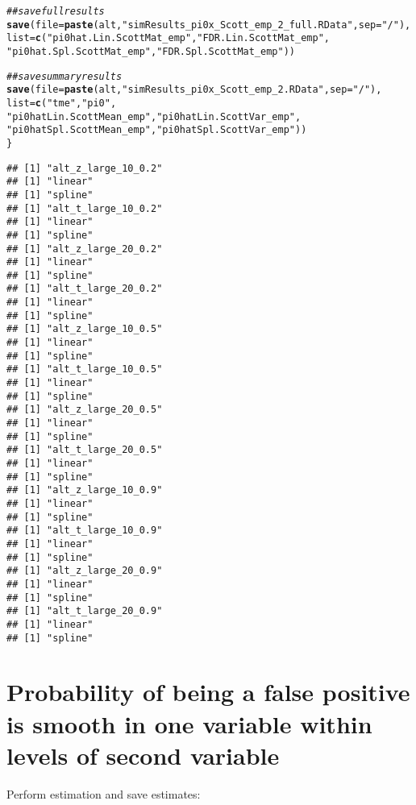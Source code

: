 \documentclass{article}\usepackage[]{graphicx}\usepackage[]{color}
\makeatletter
\newcommand{\hlstr}[1]{\textcolor[rgb]{0.192,0.494,0.8}{#1}}%
\newcommand{\hlcom}[1]{\textcolor[rgb]{0.678,0.584,0.686}{\textit{#1}}}%
\newcommand{\hlstd}[1]{\textcolor[rgb]{0.345,0.345,0.345}{#1}}%
\newcommand{\hlkwc}[1]{\textcolor[rgb]{0.333,0.667,0.333}{#1}}%
\newcommand{\hlkwd}[1]{\textcolor[rgb]{0.737,0.353,0.396}{\textbf{#1}}}%
\newenvironment{kframe}{%
 \def\at@end@of@kframe{}%
 \ifinner\ifhmode%
  \def\at@end@of@kframe{\end{minipage}}%
  \begin{minipage}{\columnwidth}%
 \fi\fi%
 \def\FrameCommand##1{\hskip\@totalleftmargin \hskip-\fboxsep
 \colorbox{shadecolor}{##1}\hskip-\fboxsep
     \hskip-\linewidth \hskip-\@totalleftmargin \hskip\columnwidth}%
 \MakeFramed {\advance\hsize-\width
   \@totalleftmargin\z@ \linewidth\hsize
   \@setminipage}}%
 {\par\unskip\endMakeFramed%
 \at@end@of@kframe}
\newenvironment{knitrout}{}{} %
\makeatother
\begin{document}
\begin{knitrout}
\begin{kframe}
\begin{alltt}
  \hlcom{##save full results}
  \hlkwd{save}\hlstd{(}\hlkwc{file}\hlstd{=}\hlkwd{paste}\hlstd{(alt,}\hlstr{"simResults_pi0x_Scott_emp_2_full.RData"}\hlstd{,}\hlkwc{sep}\hlstd{=}\hlstr{"/"}\hlstd{),}
       \hlkwc{list}\hlstd{=}\hlkwd{c}\hlstd{(}\hlstr{"pi0hat.Lin.ScottMat_emp"}\hlstd{,} \hlstr{"FDR.Lin.ScottMat_emp"}\hlstd{,}
              \hlstr{"pi0hat.Spl.ScottMat_emp"}\hlstd{,} \hlstr{"FDR.Spl.ScottMat_emp"}\hlstd{))}

  \hlcom{##save summary results}
  \hlkwd{save}\hlstd{(}\hlkwc{file}\hlstd{=}\hlkwd{paste}\hlstd{(alt,}\hlstr{"simResults_pi0x_Scott_emp_2.RData"}\hlstd{,}\hlkwc{sep}\hlstd{=}\hlstr{"/"}\hlstd{),}
       \hlkwc{list}\hlstd{=}\hlkwd{c}\hlstd{(}\hlstr{"tme"}\hlstd{,} \hlstr{"pi0"}\hlstd{,}
              \hlstr{"pi0hatLin.ScottMean_emp"}\hlstd{,} \hlstr{"pi0hatLin.ScottVar_emp"}\hlstd{,}
              \hlstr{"pi0hatSpl.ScottMean_emp"}\hlstd{,} \hlstr{"pi0hatSpl.ScottVar_emp"}\hlstd{))}
\hlstd{\}}
\end{alltt}
\begin{verbatim}
## [1] "alt_z_large_10_0.2"
## [1] "linear"
## [1] "spline"
## [1] "alt_t_large_10_0.2"
## [1] "linear"
## [1] "spline"
## [1] "alt_z_large_20_0.2"
## [1] "linear"
## [1] "spline"
## [1] "alt_t_large_20_0.2"
## [1] "linear"
## [1] "spline"
## [1] "alt_z_large_10_0.5"
## [1] "linear"
## [1] "spline"
## [1] "alt_t_large_10_0.5"
## [1] "linear"
## [1] "spline"
## [1] "alt_z_large_20_0.5"
## [1] "linear"
## [1] "spline"
## [1] "alt_t_large_20_0.5"
## [1] "linear"
## [1] "spline"
## [1] "alt_z_large_10_0.9"
## [1] "linear"
## [1] "spline"
## [1] "alt_t_large_10_0.9"
## [1] "linear"
## [1] "spline"
## [1] "alt_z_large_20_0.9"
## [1] "linear"
## [1] "spline"
## [1] "alt_t_large_20_0.9"
## [1] "linear"
## [1] "spline"
\end{verbatim}
\end{kframe}
\end{knitrout}

\section{Probability of being a false positive is smooth in one variable within levels of second variable}

Perform estimation and save estimates:
\end{document}
